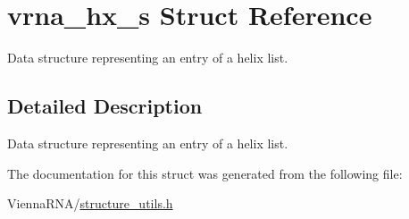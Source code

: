 \hypertarget{structvrna__hx__s}{}\section{vrna\+\_\+hx\+\_\+s Struct Reference}
\label{structvrna__hx__s}


Data structure representing an entry of a helix list.  




\subsection{Detailed Description}
Data structure representing an entry of a helix list. 

The documentation for this struct was generated from the following file\+:\begin{DoxyCompactItemize}
\item 
Vienna\+R\+N\+A/\hyperlink{structure__utils_8h}{structure\+\_\+utils.\+h}\end{DoxyCompactItemize}
